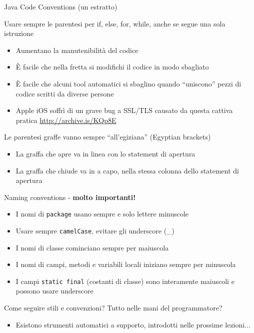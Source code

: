 \documentclass[xcolor=dvipsnames,presentation]{beamer}
\begin{document}
\begin{frame}[allowframebreaks]{Java Code Conventions (un estratto)}
    \begin{block}{Usare sempre le parentesi per if, else, for, while, anche se segue una sola istruzione}
        \begin{itemize}
            \item Aumentano la manutenibilità del codice
            \item È facile che nella fretta si modifichi il codice in modo sbagliato
            \item È facile che alcuni tool automatici si sbaglino quando ``uniscono'' pezzi di codice scritti da diverse persone
            \item Apple iOS soffrì di un grave bug a SSL/TLS causato da questa cattiva pratica \url{http://archive.is/KQp8E}
        \end{itemize}
    \end{block}
    \begin{block}{Le parentesi graffe vanno sempre ``all'egiziana'' (Egyptian brackets)}
        \begin{itemize}
            \item La graffa che apre va in linea con lo statement di apertura
            \item La graffa che chiude va in a capo, nella stessa colonna dello statement di apertura
        \end{itemize}
    \end{block}
    \begin{block}{Naming conventions - \textbf{molto importanti!}}
        \begin{itemize}
            \item I nomi di \texttt{package} usano sempre e solo lettere minuscole
            \item Usare sempre \texttt{camelCase}, evitare gli underscore (\_)
            \item I nomi di classe cominciano sempre per maiuscola
            \item I nomi di campi, metodi e variabili locali iniziano sempre per minuscola
            \item I campi \texttt{static final} (costanti di classe) sono interamente maiuscoli e possono usare underscore
        \end{itemize}
    \end{block}

Come seguire stili e convenzioni? Tutto nelle mani del programmatore?
\begin{itemize}
\item Esistono strumenti automatici a supporto, introdotti nelle prossime lezioni...
    \end{itemize}
\end{frame}
\end{document}
